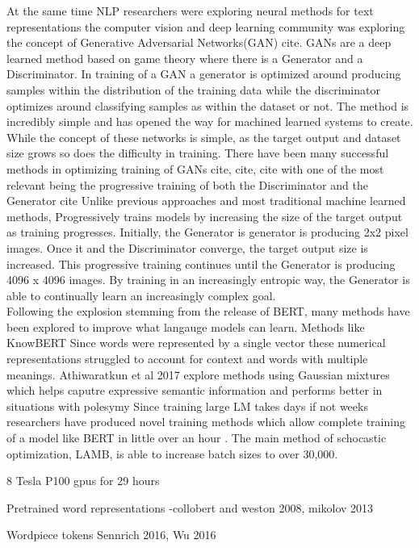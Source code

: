 \documentclass [11pt, proquest] {uwthesis}[2020/08/20]
\begin{document}
At the same time NLP researchers were exploring neural methods for text representations the computer vision and deep learning community was exploring the concept of Generative Adversarial Networks(GAN) cite. GANs are a deep learned method based on game theory where there is a Generator and a Discriminator. In training of a GAN a generator is optimized around producing samples within the distribution of the training data while the discriminator optimizes around classifying samples as within the dataset or not. The method is incredibly simple and has opened the way for machined learned systems to create. While the concept of these networks is simple, as the target output and dataset size grows so does the difficulty in training. There have been many successful methods in optimizing training of GANs cite, cite, cite with one of the most relevant being the progressive training of both the Discriminator and the Generator cite Unlike previous approaches and most traditional machine learned methods, Progressively trains models by increasing the size of the target output as training progresses. Initially, the Generator is generator is producing 2x2 pixel images. Once it and the Discriminator converge, the target output size is increased. This progressive training continues until the Generator is producing 4096 x 4096 images. By training in an increasingly entropic way, the Generator is able to continually learn an increasingly complex goal. \\

Following the explosion stemming from the release of BERT, many methods have been explored to improve what langauge models can learn. Methods like KnowBERT \cite{Peters2019KnowledgeEC}
Since words were represented by a single vector these numerical representations struggled to account for context and words with multiple meanings. Athiwaratkun et al 2017 \cite{Athiwaratkun2017MultimodalWD} explore methods using Gaussian mixtures which helps caputre expressive semantic information and performs better in situations with polesymy  
Since training large LM takes days if not weeks researchers have produced novel training methods which allow complete training of a model like BERT in little over an hour \cite{You2019LargeBO}. The main method of schocastic optimization, LAMB, is able to increase batch sizes to over 30,000. 

8 Tesla P100 gpus for 29 hours 

Pretrained word representations
-collobert and weston 2008, mikolov 2013

Wordpiece tokens Sennrich 2016, Wu 2016
\end{document}
